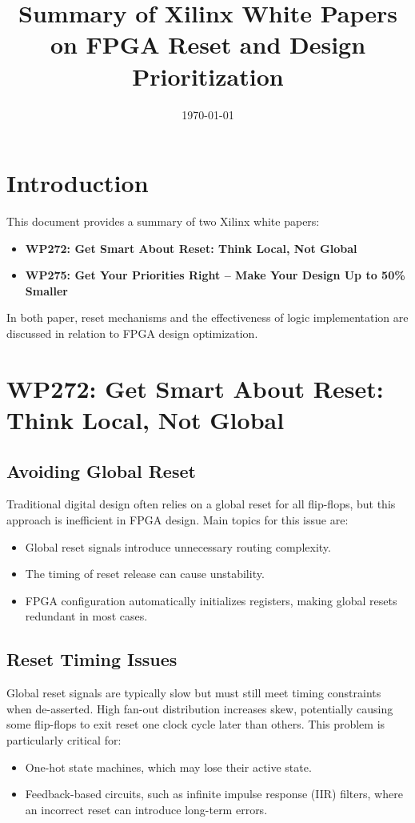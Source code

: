 \documentclass{article}
\title{Summary of Xilinx White Papers on FPGA Reset and Design Prioritization}
\date{\today}
\begin{document}
	
	\maketitle
	
	\section{Introduction}
	This document provides a summary of two Xilinx white papers: 
	\begin{itemize}
		\item \textbf{WP272: Get Smart About Reset: Think Local, Not Global}
		\item \textbf{WP275: Get Your Priorities Right – Make Your Design Up to 50\% Smaller}
	\end{itemize}
	In both paper, reset mechanisms and the effectiveness of logic implementation are discussed in relation to FPGA design optimization.
	
	\section{WP272: Get Smart About Reset: Think Local, Not Global}
	
	\subsection{Avoiding Global Reset}
	Traditional digital design often relies on a global reset for all flip-flops, but this approach is inefficient in FPGA design. Main topics for this issue are:
	\begin{itemize}
		\item Global reset signals introduce unnecessary routing complexity.
		\item The timing of reset release can cause unstability.
		\item FPGA configuration automatically initializes registers, making global resets redundant in most cases.
	\end{itemize}
	
	\subsection{Reset Timing Issues}
	Global reset signals are typically slow but must still meet timing constraints when de-asserted. High fan-out distribution increases skew, potentially causing some flip-flops to exit reset one clock cycle later than others. This problem is particularly critical for:
	\begin{itemize}
		\item One-hot state machines, which may lose their active state.
		\item Feedback-based circuits, such as infinite impulse response (IIR) filters, where an incorrect reset can introduce long-term errors.
	\end{itemize}
	
\end{document}
